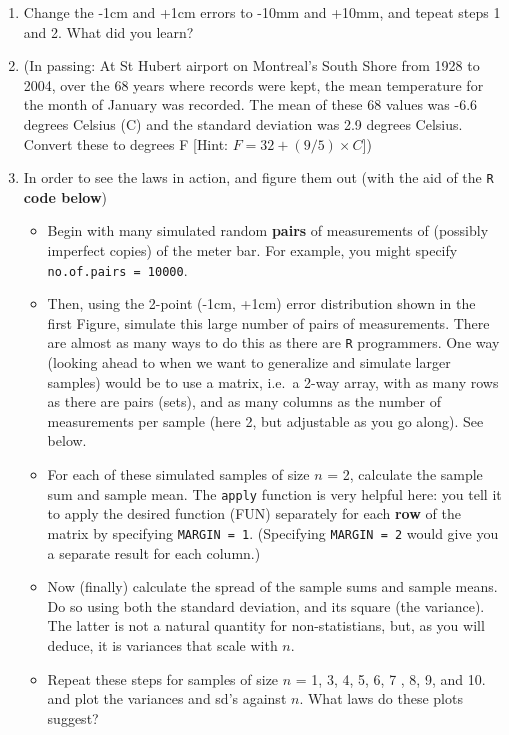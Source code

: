 \documentclass[]{book}
\begin{document}
\begin{enumerate}
\item
  Change the -1cm and +1cm errors to -10mm and +10mm, and tepeat steps 1 and 2. What did you learn?
\item
  (In passing: At St Hubert airport on Montreal's South Shore from 1928 to 2004, over the 68 years where records were kept, the mean temperature for the month of January was recorded. The mean of these 68 values was -6.6 degrees Celsius (C) and the standard deviation was 2.9 degrees Celsius. Convert these to degrees F {[}Hint: \(F = 32 + (9/5) \times C\){]})
\item
  In order to see the laws in action, and figure them out (with the aid of the \texttt{R} \textbf{code below})

  \begin{itemize}
  \item
    Begin with many simulated random \textbf{pairs} of measurements of (possibly imperfect copies) of the meter bar. For example, you might specify \texttt{no.of.pairs\ =\ 10000}.
  \item
    Then, using the 2-point (-1cm, +1cm) error distribution shown in the first Figure, simulate this large number of pairs of measurements. There are almost as many ways to do this as there are \texttt{R} programmers. One way (looking ahead to when we want to generalize and simulate larger samples) would be to use a matrix, i.e.~a 2-way array, with as many rows as there are pairs (sets), and as many columns as the number of measurements per sample (here 2, but adjustable as you go along). See below.
  \item
    For each of these simulated samples of size \(n\) = 2, calculate the sample sum and sample mean. The \texttt{apply} function is very helpful here: you tell it to apply the desired function (FUN) separately for each \textbf{row} of the matrix by specifying \texttt{MARGIN\ =\ 1}. (Specifying \texttt{MARGIN\ =\ 2} would give you a separate result for each column.)
  \item
    Now (finally) calculate the spread of the sample sums and sample means. Do so using both the standard deviation, and its square (the variance). The latter is not a natural quantity for non-statistians, but, as you will deduce, it is variances that scale with \(n\).
  \item
    Repeat these steps for samples of size \(n\) = 1, 3, 4, 5, 6, 7 , 8, 9, and 10. and plot the variances and sd's against \(n.\) What laws do these plots suggest?
  \end{itemize}
\end{enumerate}
\end{document}
